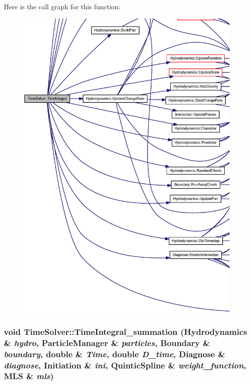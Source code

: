 Here is the call graph for this function:\nopagebreak
\begin{figure}[H]
\begin{center}
\leavevmode
\includegraphics[width=420pt]{classTimeSolver_edd74b3f1e292277b972b938787f4a3c_cgraph}
\end{center}
\end{figure}
\hypertarget{classTimeSolver_2cbbdd8eecbd3aae12c153f8b9da1402}{
\subsubsection[{TimeIntegral\_\-summation}]{\setlength{\rightskip}{0pt plus 5cm}void TimeSolver::TimeIntegral\_\-summation ({\bf Hydrodynamics} \& {\em hydro}, \/  {\bf ParticleManager} \& {\em particles}, \/  {\bf Boundary} \& {\em boundary}, \/  double \& {\em Time}, \/  double {\em D\_\-time}, \/  {\bf Diagnose} \& {\em diagnose}, \/  {\bf Initiation} \& {\em ini}, \/  {\bf QuinticSpline} \& {\em weight\_\-function}, \/  {\bf MLS} \& {\em mls})}}
\label{classTimeSolver_2cbbdd8eecbd3aae12c153f8b9da1402}


